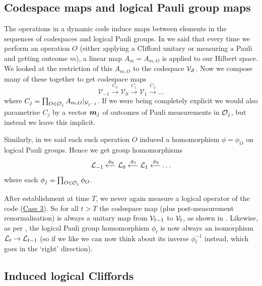 \subsection{Codespace maps and logical Pauli group maps}

The operations in a dynamic code induce maps between elements in the sequences of codespaces and logical Pauli groups.
In  we said that every time we perform an operation $O$ (either applying a Clifford unitary or measuring a Pauli and getting outcome $m$), a linear map $A_m = A_{m, O}$ is applied to our Hilbert space.
We looked at the restriction of this $A_{m, O}$ to the codespace $\mathcal{V}_{\mathcal{S}}$.
Now we compose many of these together to get codespace maps
\begin{equation}\label{eq:codespace_maps}
    \mathcal{V}_{-1} \xrightarrow{C_0} \mathcal{V}_{0} \xrightarrow{C_1} \mathcal{V}_{1} \xrightarrow{C_2} \ldots
\end{equation}
where $C_j = \prod_{O \in \mathcal{O}_j} A_{m, O}|_{\mathcal{V}_{j-1}}$.
If we were being completely explicit we would also parametrise $C_j$ by a vector $\boldsymbol{m}_j$ of outcomes of Pauli measurements in $\mathcal{O}_j$, but instead we leave this implicit.

Similarly, in  we said each such operation $O$ induced a homomorphism $\phi = \phi_O$ on logical Pauli groups.
Hence we get group homomorphisms
\begin{equation}\label{eq:logical_pauli_group_maps}
    \mathcal{L}_{-1} \xleftarrow{\phi_0} \mathcal{L}_0 \xleftarrow{\phi_1} \mathcal{L}_1 \xleftarrow{\phi_2} \ldots
\end{equation}
where each $\phi_j = \prod_{O \in \mathcal{O}_j} \phi_O$.

After establishment at time $T$, we never again measure a logical operator of the code (\hyperref[thm:stabilizer_group_update_measurement:case3]{Case 3}).
So for all $t > T$ the codespace map (plus post-measurement renormalisation) is always a unitary map from $\mathcal{V}_{t-1}$ to $\mathcal{V}_t$, as shown in .
Likewise, as per , the logical Pauli group homomorphism $\phi_t$ is now always an isomorphism $\mathcal{L}_t \to \mathcal{L}_{t-1}$ (so if we like we can now think about its inverse $\phi_t^{-1}$ instead, which goes in the `right' direction).

\subsection{Induced logical Cliffords}\label{subsec:induced-logical-cliffords}

